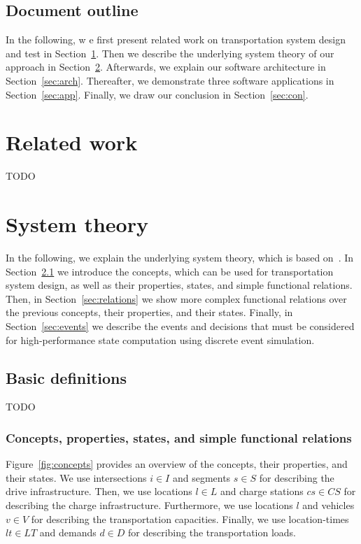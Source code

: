 \documentclass{IEEEtran}
\begin{document}
    \subsection{Document outline}
    In the following, w e first present related work on transportation system design and test in Section~\ref{sec:related}.
    Then we describe the underlying system theory of our approach in Section~\ref{sec:theory}.
    Afterwards, we explain our software architecture in Section~\ref{sec:arch}.
    Thereafter, we demonstrate three software applications in Section~\ref{sec:app}.
    Finally, we draw our conclusion in Section~\ref{sec:con}.

    \section{Related work}
    \label{sec:related}
    TODO

    \section{System theory}
    \label{sec:theory}
    In the following, we explain the underlying system theory, which is based on~\cite{Ascher2014,Ascher2015,Ascher2016,Ascher2017}.
    In Section~\ref{sec:concepts} we introduce the concepts, which can be used for transportation system design, as well as their properties, states, and simple functional relations.
    Then, in Section~\ref{sec:relations} we show more complex functional relations over the previous concepts, their properties, and their states.
    Finally, in Section~\ref{sec:events} we describe the events and decisions that must be considered for high-performance state computation using discrete event simulation.

    \subsection{Basic definitions}
    \label{sec:concepts}
    TODO

    \subsubsection{Concepts, properties, states, and simple functional relations}
    Figure~\ref{fig:concepts} provides an overview of the concepts, their properties, and their states.
    We use intersections $i \in I$ and segments $s \in S$ for describing the drive infrastructure.
    Then, we use locations $l \in L$ and charge stations $cs \in CS$ for describing the charge infrastructure.
    Furthermore, we use locations $l$ and vehicles $v \in V$ for describing the transportation capacities.
    Finally, we use location-times $lt \in LT$ and demands $d \in D$ for describing the transportation loads.
\end{document}
